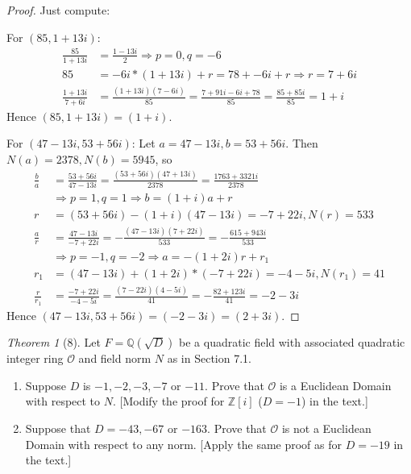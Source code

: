 \documentclass[12pt]{article}
\theoremstyle{remark}
\theoremstyle{named}
\newtheorem*{theorem}{Theorem}
\newcommand{\Z}{\mathbb Z}
\newcommand{\Q}{\mathbb Q}
\begin{document}
\begin{proof}
    Just compute:

    For \((85, 1 + 13i)\):
    \begin{align*}
        \frac{85}{1 + 13i} &= \frac{1 - 13i}{2} \Rightarrow p = 0, q = -6 \\
        85 &= -6i * (1 + 13i) + r = 78 + -6i + r \Rightarrow r = 7 + 6i \\
        \frac{1 + 13i}{7 + 6i} &= \frac{(1 + 13i) (7 - 6i)}{85} = \frac{7 + 91i - 6i + 78}{85} = \frac{85 + 85i}{85} = 1 + i 
    \end{align*}
    Hence \((85, 1 + 13i) = (1 + i)\).

    For \((47 - 13i, 53 + 56i)\): 
    Let \(a = 47 - 13i, b = 53 + 56i\). Then \(N(a) = 2378, N(b) = 5945\), so
    \begin{align*}
        \frac{b}{a} &= \frac{53 + 56i}{47 - 13i} = \frac{(53 + 56i) (47 + 13i)}{2378} = \frac{1763 + 3321i}{2378} \\
        &\Rightarrow p = 1, q = 1 \Rightarrow b = (1 + i) a + r \\
        r &= (53 + 56i) - (1 + i)(47 - 13i) = -7 + 22i, N(r) = 533 \\
        \frac{a}{r} &= \frac{47 - 13i}{-7 + 22i} = -\frac{(47 - 13i) (7 + 22i)}{533} = -\frac{615 + 943i}{533} \\
        &\Rightarrow p = -1, q = -2 \Rightarrow a = -(1 + 2i) r + r_1 \\
        r_1 &= (47 - 13i) + (1 + 2i)*(-7 + 22i) = -4 - 5i, N(r_1) = 41 \\
        \frac{r}{r_1} &= \frac{-7 + 22i}{-4-5i} = \frac{(7 - 22i) (4 - 5i)}{41} = - \frac{82 + 123i}{41} = -2 -3i
    \end{align*}
    Hence \((47 - 13i, 53 + 56i) = (-2 - 3i) = (2 + 3i)\).
\end{proof}

\begin{theorem}[8]
    Let \(F = \Q(\sqrt{D})\) be a quadratic field with associated quadratic integer ring \(\mathcal O\) and field norm \(N\) as in Section 7.1.
    \begin{enumerate}
        \item Suppose \(D\) is \(-1, -2, -3, -7\) or \(-11\). Prove that \(\mathcal O\) is a Euclidean Domain with respect to \(N\). [Modify the proof for \(\Z[i]\) (\(D = -1\)) in the text.]
        \item Suppose that \(D = -43, -67\) or \(-163\). Prove that \(\mathcal O\) is not a Euclidean Domain with respect to any norm. [Apply the same proof as for \(D = -19\) in the text.]
    \end{enumerate}
\end{theorem}
\end{document}
